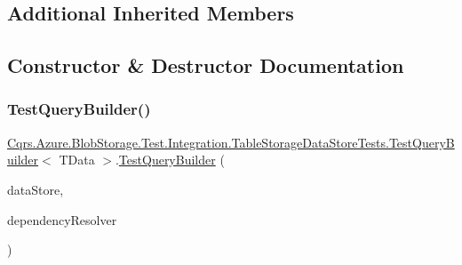\subsection*{Additional Inherited Members}


\subsection{Constructor \& Destructor Documentation}
\mbox{\label{classCqrs_1_1Azure_1_1BlobStorage_1_1Test_1_1Integration_1_1TableStorageDataStoreTests_1_1TestQueryBuilder_ada46a3061a76cebf70f07e5286c73f85_ada46a3061a76cebf70f07e5286c73f85}} 
\subsubsection{\texorpdfstring{Test\+Query\+Builder()}{TestQueryBuilder()}}
{\footnotesize\ttfamily \hyperlink{classCqrs_1_1Azure_1_1BlobStorage_1_1Test_1_1Integration_1_1TableStorageDataStoreTests_1_1TestQueryBuilder}{Cqrs.\+Azure.\+Blob\+Storage.\+Test.\+Integration.\+Table\+Storage\+Data\+Store\+Tests.\+Test\+Query\+Builder}$<$ T\+Data $>$.\hyperlink{classCqrs_1_1Azure_1_1BlobStorage_1_1Test_1_1Integration_1_1TableStorageDataStoreTests_1_1TestQueryBuilder}{Test\+Query\+Builder} (\begin{DoxyParamCaption}\item[{\hyperlink{interfaceCqrs_1_1DataStores_1_1IDataStore}{I\+Data\+Store}$<$ T\+Data $>$}]{data\+Store,  }\item[{\hyperlink{interfaceCqrs_1_1Configuration_1_1IDependencyResolver}{I\+Dependency\+Resolver}}]{dependency\+Resolver }\end{DoxyParamCaption})}



